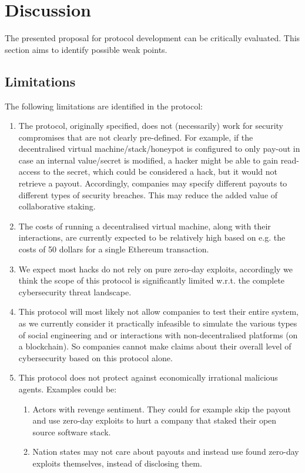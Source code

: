 \section{Discussion}
\label{sec:discussion}
The presented proposal for protocol development can be critically evaluated. This section aims to identify possible weak points.
\subsection{Limitations}
The following limitations are identified in the protocol:
\begin{enumerate}
    \item The protocol, originally specified, does not (necessarily) work for security compromises that are not clearly pre-defined. For example, if the decentralised virtual machine/stack/honeypot is configured to only pay-out in case an internal value/secret is modified, a hacker might be able to gain read-access to the secret, which could be considered a hack, but it would not retrieve a payout. Accordingly, companies may specify different payouts to different types of security breaches. This may reduce the added value of collaborative staking.
    \item The costs of running a decentralised virtual machine, along with their interactions, are currently expected to be relatively high based on e.g. the costs of 50 dollars for a single Ethereum transaction.
    \item We expect most hacks do not rely on pure zero-day exploits, accordingly we think the scope of this protocol is significantly limited w.r.t. the complete cybersecurity threat landscape.
    \item This protocol will most likely not allow companies to test their entire system, as we currently consider it practically infeasible to simulate the various types of social engineering and or interactions with non-decentralised platforms (on a blockchain). So companies cannot make claims about their overall level of cybersecurity based on this protocol alone.
    \item This protocol does not protect against economically irrational malicious agents. Examples could be:
    \begin{enumerate}
        \item Actors with revenge sentiment. They could for example skip the payout and use zero-day exploits to hurt a company that staked their open source software stack.
        \item Nation states may not care about payouts and instead use found zero-day exploits themselves, instead of disclosing them.
    \end{enumerate}
\end{enumerate}

